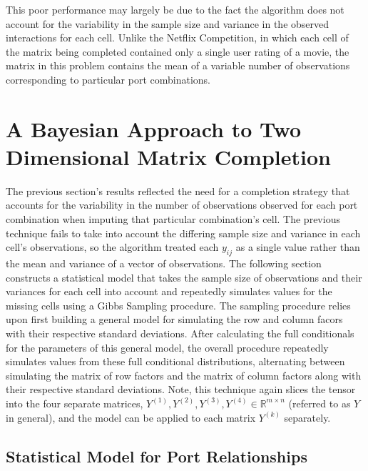 \documentclass[12pt,twoside]{dukestatscithesis}
\theoremstyle{definition}
\theoremstyle{definition}
\theoremstyle{definition}
\theoremstyle{remark}
\begin{document}
This poor performance may largely be due to the fact the algorithm does
not account for the variability in the sample size and variance in the
observed interactions for each cell. Unlike the Netflix Competition, in
which each cell of the matrix being completed contained only a single
user rating of a movie, the matrix in this problem contains the mean of
a variable number of observations corresponding to particular port
combinations.

\chapter{A Bayesian Approach to Two Dimensional Matrix
Completion}\label{a-bayesian-approach-to-two-dimensional-matrix-completion}

The previous section's results reflected the need for a completion
strategy that accounts for the variability in the number of observations
observed for each port combination when imputing that particular
combination's cell. The previous technique fails to take into account
the differing sample size and variance in each cell's observations, so
the algorithm treated each \(y_{ij}\) as a single value rather than the
mean and variance of a vector of observations. The following section
constructs a statistical model that takes the sample size of
observations and their variances for each cell into account and
repeatedly simulates values for the missing cells using a Gibbs Sampling
procedure. The sampling procedure relies upon first building a general
model for simulating the row and column facors with their respective
standard deviations. After calculating the full conditionals for the
parameters of this general model, the overall procedure repeatedly
simulates values from these full conditional distributions, alternating
between simulating the matrix of row factors and the matrix of column
factors along with their respective standard deviations. Note, this
technique again slices the tensor into the four separate matrices,
\(Y^{(1)}, Y^{(2)}, Y^{(3)}, Y^{(4)} \in \mathbb{R}^{m \times n}\)
(referred to as \(Y\) in general), and the model can be applied to each
matrix \(Y^{(k)}\) separately.

\section{Statistical Model for Port
Relationships}\label{statistical-model-for-port-relationships}
\end{document}
